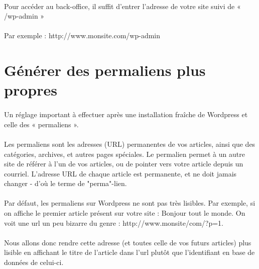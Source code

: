 \documentclass[10pt,a4paper]{article}
\begin{document}
\paragraph{}Pour accéder au back-office, il suffit d'entrer l'adresse de votre site suivi de « /wp-admin »
\paragraph{}Par exemple : http://www.monsite.com/wp-admin
\newpage

\section{Générer des permaliens plus propres}
\paragraph{}Un réglage important à effectuer après une installation fraîche de Wordpress et celle des « permaliens ».
\paragraph{}Les permaliens sont les adresses (URL) permanentes de vos articles, ainsi que des catégories, archives, et autres pages spéciales. Le permalien permet à un autre site de référer à l'un de vos articles, ou de pointer vers votre article depuis un courriel. L'adresse URL de chaque article est permanente, et ne doit jamais changer - d'où le terme de "perma"-lien.
\paragraph{}Par défaut, les permaliens sur Wordpress ne sont pas très lisibles. Par exemple, si on affiche le premier article présent sur votre site : Bonjour tout le monde. On voit une url un peu bizarre du genre :  http://www.monsite/com/?p=1.
\paragraph{}Nous allons donc rendre cette adresse (et toutes celle de vos futurs articles) plus lisible en affichant le titre de l'article dans l'url plutôt que l'identifiant en base de données de celui-ci.
\end{document}
